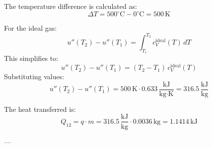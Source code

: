 The temperature difference is calculated as:  
\[
\Delta T = 500^\circ\text{C} - 0^\circ\text{C} = 500 \, \text{K}
\]  

For the ideal gas:  
\[
u''(T_2) - u''(T_1) = \int_{T_1}^{T_2} c_V^{\text{ideal}}(T) \, dT
\]  
This simplifies to:  
\[
u''(T_2) - u''(T_1) = (T_2 - T_1) \, c_V^{\text{ideal}}(T)
\]  
Substituting values:  
\[
u''(T_2) - u''(T_1) = 500 \, \text{K} \cdot 0.633 \, \frac{\text{kJ}}{\text{kg·K}} = 316.5 \, \frac{\text{kJ}}{\text{kg}}
\]  

The heat transferred is:  
\[
Q_{12} = q \cdot m = 316.5 \, \frac{\text{kJ}}{\text{kg}} \cdot 0.0036 \, \text{kg} = 1.1414 \, \text{kJ}
\]  

---